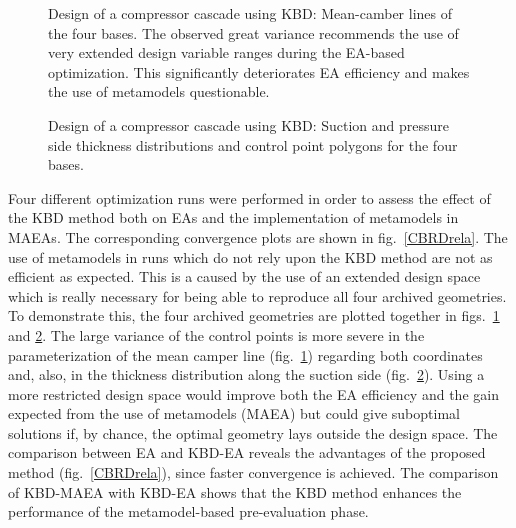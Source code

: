 \begin{figure}[h!]
\begin{minipage}[b]{1\linewidth}
 \centering
\end{minipage}
\caption{Design of a compressor cascade using KBD: Mean-camber lines of the four bases. The observed great variance recommends the use of very extended design variable ranges during the EA-based optimization. This significantly deteriorates EA efficiency and makes the use of metamodels questionable. } 
\label{CBRDmm}
\end{figure}

\begin{figure}[h!]
\begin{minipage}[b]{1\linewidth}
 \centering
\end{minipage}
\caption{Design of a compressor cascade using KBD: Suction and pressure side thickness distributions and control point polygons for the four bases.} 
\label{CBRDtt}
\end{figure}


Four different optimization runs were performed in order to assess the effect of the KBD method both on EAs and the implementation of metamodels in MAEAs. The corresponding convergence plots are shown in fig.\ \ref{CBRDrela}. The use of metamodels in runs which do not rely upon the KBD method are not as efficient as expected. This is a caused by the use of an extended design space which is really necessary for being able to reproduce all four archived geometries. To demonstrate this, the four archived geometries are plotted together in figs.\ \ref{CBRDmm} and \ref{CBRDtt}. The large variance of the control points is more severe in the parameterization of the mean camper line (fig.\ \ref{CBRDmm}) regarding both coordinates and, also, in the thickness distribution along the suction side (fig.\ \ref{CBRDtt}). Using a more restricted design space would improve both the EA efficiency and the gain expected from the use of metamodels (MAEA) but could give suboptimal solutions if, by chance, the optimal geometry lays outside the design space. The comparison between EA and KBD-EA reveals the advantages of the proposed method (fig.\ \ref{CBRDrela}), since faster convergence is achieved. The comparison of KBD-MAEA with KBD-EA shows that the KBD method enhances the performance of the metamodel-based pre-evaluation phase. 

